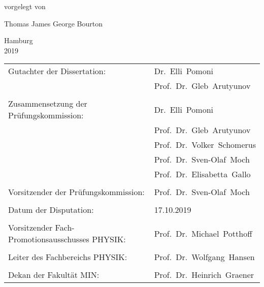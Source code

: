 \begin{titlepage}
{\begin{center}
  		
  		\vspace{1.6cm}
  		
  		
  		vorgelegt von%
  		
  		\vspace{1.cm}
  		
  		
  		{\Large Thomas James George Bourton}%
  		
  	\end{center}
  }
  \vspace{1.5cm}
  {\large \begin{center}Hamburg\\2019\end{center} }
\end{titlepage}
\clearpage


\newpage
\thispagestyle{empty}
\mbox{}

\newpage
\thispagestyle{empty}

\vspace*{\fill}


\noindent 
\begin{tabular}{@{}ll}
	Gutachter der Dissertation: 					& Dr.~Elli~Pomoni\\
	\hspace{10cm}									& Prof.~Dr.~Gleb~Arutyunov \\
	\\
	Zusammensetzung der Pr\"ufungskommission: 		
													& Dr.~Elli~Pomoni \\
													& Prof.~Dr.~Gleb~Arutyunov \\
													& Prof.~Dr.~Volker~Schomerus \\
													& Prof.~Dr.~Sven-Olaf~Moch  \\
													& Prof.~Dr.~Elisabetta~Gallo \\
	\\
	Vorsitzender der Pr\"ufungskommission:			& Prof.~Dr.~Sven-Olaf~Moch  \\
	\\
	Datum der Disputation:							& 17.10.2019 \\
	\\
	Vorsitzender Fach-Promotionsausschusses PHYSIK: & Prof.~Dr.~Michael~Potthoff \\
	\\
	Leiter des Fachbereichs PHYSIK:					&  Prof.~Dr.~Wolfgang~Hansen\\
	\\
	Dekan der Fakult\"at MIN:							& Prof.~Dr.~Heinrich~Graener
\end{tabular}

